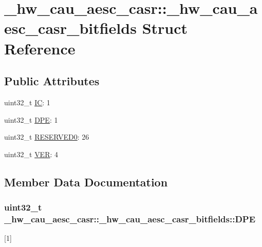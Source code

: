\hypertarget{struct__hw__cau__aesc__casr_1_1__hw__cau__aesc__casr__bitfields}{}\section{\+\_\+hw\+\_\+cau\+\_\+aesc\+\_\+casr\+:\+:\+\_\+hw\+\_\+cau\+\_\+aesc\+\_\+casr\+\_\+bitfields Struct Reference}
\label{struct__hw__cau__aesc__casr_1_1__hw__cau__aesc__casr__bitfields}
\subsection*{Public Attributes}
\begin{DoxyCompactItemize}
\item 
uint32\+\_\+t \hyperlink{struct__hw__cau__aesc__casr_1_1__hw__cau__aesc__casr__bitfields_a0dbb649992e4ed2fe9e2b00b398fc6ca}{IC}\+: 1
\item 
uint32\+\_\+t \hyperlink{struct__hw__cau__aesc__casr_1_1__hw__cau__aesc__casr__bitfields_acacd9dcf0e5b703504d18b3f5f730cb6}{D\+PE}\+: 1
\item 
uint32\+\_\+t \hyperlink{struct__hw__cau__aesc__casr_1_1__hw__cau__aesc__casr__bitfields_addb7d0e3716a734718411464b15c6f89}{R\+E\+S\+E\+R\+V\+E\+D0}\+: 26
\item 
uint32\+\_\+t \hyperlink{struct__hw__cau__aesc__casr_1_1__hw__cau__aesc__casr__bitfields_a985b33f63edbf9b42fa57d4a3d86c146}{V\+ER}\+: 4
\end{DoxyCompactItemize}


\subsection{Member Data Documentation}
\subsubsection[{\texorpdfstring{D\+PE}{DPE}}]{\setlength{\rightskip}{0pt plus 5cm}uint32\+\_\+t \+\_\+hw\+\_\+cau\+\_\+aesc\+\_\+casr\+::\+\_\+hw\+\_\+cau\+\_\+aesc\+\_\+casr\+\_\+bitfields\+::\+D\+PE}\hypertarget{struct__hw__cau__aesc__casr_1_1__hw__cau__aesc__casr__bitfields_acacd9dcf0e5b703504d18b3f5f730cb6}{}\label{struct__hw__cau__aesc__casr_1_1__hw__cau__aesc__casr__bitfields_acacd9dcf0e5b703504d18b3f5f730cb6}
\mbox{[}1\mbox{]} 
